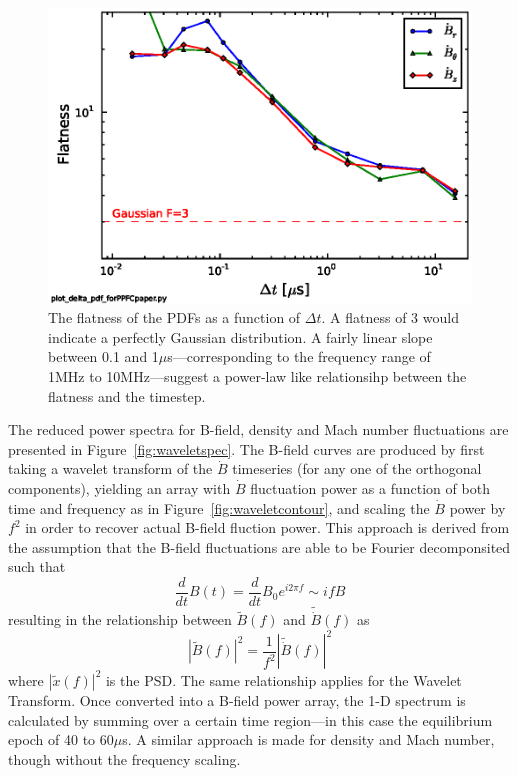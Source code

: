 \documentclass[12pt]{iopart}
\begin{document}
\begin{figure}[!htbp]
\centerline{
\includegraphics[width=16cm]{flatness.eps}}
\caption{\label{fig:flatness} The flatness of the PDFs as a function of $\Delta t$. A flatness of 3 would indicate a perfectly Gaussian distribution. A fairly linear slope between 0.1 and 1$\mu$s---corresponding to the frequency range of 1MHz to 10MHz---suggest a power-law like relationsihp between the flatness and the timestep.}
\end{figure}

The reduced power spectra for B-field, density and Mach number fluctuations are presented in Figure~\ref{fig:waveletspec}. The B-field curves are produced by first taking a wavelet transform of the $\dot{B}$ timeseries (for any one of the orthogonal components), yielding an array with $\dot{B}$ fluctuation power as a function of both time and frequency as in Figure~\ref{fig:waveletcontour}, and scaling the $\dot{B}$ power by $f^{2}$ in order to recover actual B-field fluction power. This approach is derived from the assumption that the B-field fluctuations are able to be Fourier decomponsited such that
%
\begin{equation}
\frac{d}{dt}B(t) = \frac{d}{dt}B_{0}e^{i2\pi f} \sim ifB
\end{equation}
%
resulting in the relationship between $\tilde{B}(f)$ and $\tilde{\dot{B}}(f)$ as
%
\begin{equation}
|\tilde{B}(f)|^{2} = \frac{1}{f^{2}}|\tilde{\dot{B}}(f)|^{2}
\end{equation}
%
where $|\tilde{x}(f)|^{2}$ is the PSD. The same relationship applies for the Wavelet Transform. Once converted into a B-field power array, the 1-D spectrum is calculated by summing over a certain time region---in this case the equilibrium epoch of 40 to 60$\mu$s. A similar approach is made for density and Mach number, though without the frequency scaling.
\end{document}
